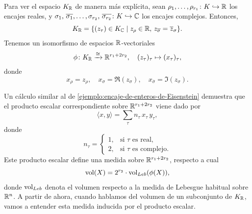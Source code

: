 \begin{comentario}
  Para ver el espacio $K_{\mathbb{R}}$ de manera más explícita, sean
  $\rho_1, \ldots, \rho_{r_1}\colon K \hookrightarrow \mathbb{R}$
  los encajes reales, y
  $\sigma_1, \, \overline{\sigma_1}, \ldots, \sigma_{r_2}, \, \overline{\sigma_{r_2}} \colon K \hookrightarrow \mathbb{C}$
  los encajes complejos. Entonces,
  $$K_{\mathbb{R}} = \{ (z_\tau) \in K_{\mathbb{C}} \mid z_\rho \in \mathbb{R}, \, z_{\overline{\sigma}} = \overline{z}_\sigma \}.$$
  Tenemos un isomorfismo de espacios $\mathbb{R}$-vectoriales
  \[ \phi\colon K_{\mathbb{R}} \xrightarrow{\cong} \mathbb{R}^{r_1 + 2 r_2}, \quad
  (z_\tau)_\tau \mapsto (x_\tau)_\tau, \]
  donde
  \[ x_\rho = z_\rho, \quad
  x_\sigma = \Re (z_\sigma), \quad
  x_{\overline{\sigma}} = \Im (z_\sigma). \]

  Un cálculo similar al de \ref{ejemplo:encaje-de-enteros-de-Eisenstein}
  demuestra que el producto escalar correspondiente sobre $\mathbb{R}^{r_1 + 2 r_2}$
  viene dado por
  $$\langle x,y\rangle = \sum_\tau n_\tau \, x_\tau \, y_\tau,$$
  donde
  \[ n_\tau = \begin{cases}
    1, & \text{si }\tau\text{ es real},\\
    2, & \text{si }\tau\text{ es complejo}.
  \end{cases} \]
  Este producto escalar define una medida sobre $\mathbb{R}^{r_1 + 2r_2}$, respecto
  a cual
  $$\operatorname{vol} (X) = 2^{r_2}\cdot \operatorname{vol}_{Leb} (\phi (X)),$$
  donde $\operatorname{vol}_{Leb}$ denota el volumen respecto a la medida de Lebesgue
  habitual sobre $\mathbb{R}^n$. A partir de ahora, cuando hablamos del volumen de un
  subconjunto de $K_{\mathbb{R}}$, vamos a entender esta medida inducida por el producto
  escalar.
\end{comentario}


